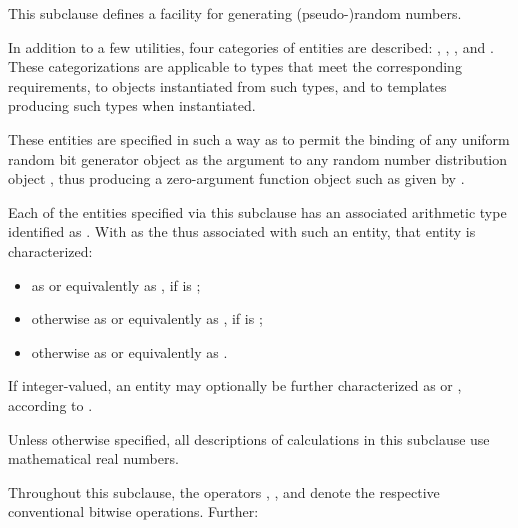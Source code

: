 %
%
%
%

\pnum
This subclause defines a facility
for generating (pseudo-)random numbers.

\pnum
In addition to a few utilities,
four categories of entities are described:
,
,
,
and
.
These categorizations are applicable
to types that meet the corresponding requirements,
to objects instantiated from such types,
and to templates producing such types when instantiated.
\begin{note}
 These entities are specified in such a way
 as to permit the binding
 of any uniform random bit generator object 
 as the argument
 to any random number distribution object ,
 thus producing a zero-argument function object
 such as given by
 .
\end{note}

\pnum
{}%
Each of the entities specified via this subclause
has an associated arithmetic type
identified as .
With  as the 
thus associated with such an entity,
that entity is characterized:
\begin{itemize}
 \item
   as  or equivalently as ,
   if  is ;
 \item
   otherwise
   as  or equivalently as ,
   if  is ;
 \item
   otherwise
   as  or equivalently as .
\end{itemize}
\noindent
If integer-valued,
an entity may optionally be further characterized as
 or ,
according to .

\pnum
Unless otherwise specified,
all descriptions of calculations
in this subclause
use mathematical real numbers.

\pnum
Throughout this subclause,
the operators
\bitand, \bitor, and \xor{}
denote the respective conventional bitwise operations.
Further:

